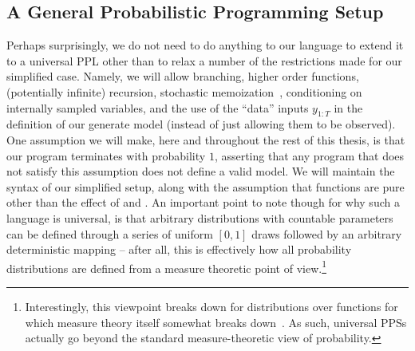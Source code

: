 %
%

\subsection{A General Probabilistic Programming Setup}
\label{sec:probprog:models:general}

Perhaps surprisingly, we do not need to do anything to our language to extend it to a universal
PPL other than to relax a number of the restrictions made for our simplified case.  Namely,
we will allow branching, higher order functions, (potentially infinite) recursion, stochastic memoization~\citep{goodman2008church},
conditioning on internally sampled
variables, and the use of the ``data'' inputs $y_{1:T}$ in the definition of our generate model (instead of
just allowing them to be observed).  One assumption we will make, here and throughout the rest of this thesis,
is that our program terminates with probability $1$,
asserting that any program that does not satisfy this assumption does not define a valid model.  
We will maintain the syntax of our simplified
setup, along with the assumption that functions are pure other than the effect of \sample and \observe.
An important point to note though for why such a language is universal, is that arbitrary distributions
with countable parameters can be defined through a series of uniform $[0,1]$ draws followed
by an arbitrary deterministic mapping -- after all, this is effectively how all probability distributions are
defined from a measure theoretic point of view.\footnote{Interestingly, this viewpoint breaks down for
	distributions over functions for which measure theory itself somewhat breaks down~\cite{heunen2017convenient}.
	As such, universal PPSs actually go beyond the standard measure-theoretic view of probability.}


